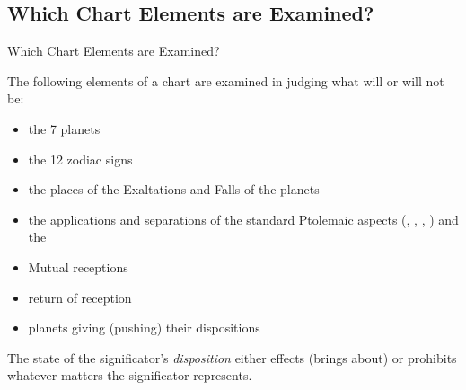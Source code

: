 \subsection{Which Chart Elements are Examined?}
\begin{frame}[t]{Which Chart Elements are Examined?}

The following elements of a chart are examined in judging what will or will not be:
\begin{itemize}
\item the 7 planets
\item the 12 zodiac signs
\item the places of  the Exaltations and Falls of the planets
\item the applications and separations of the standard Ptolemaic aspects (\Sextile, \Square, \Trine, \Opposition) and the \Conjunction
\item Mutual receptions
\item return of reception
\item planets giving (pushing) their dispositions
\end{itemize}
\vspace{0.5cm}

The state of the significator's \textsl{disposition} either effects (brings about) or prohibits whatever matters the significator represents.
\end{frame}
